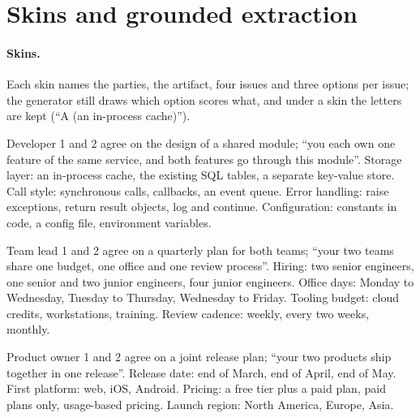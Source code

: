 \section{Skins and grounded extraction}
\label{app:skins}
\paragraph{Skins.} Each skin names the parties, the artifact, four issues and three options per issue; the generator still draws which option scores what, and under a skin the letters are kept (``A (an in-process cache)'').
\begin{description}\small
  \item[software design] Developer 1 and 2 agree on the design of a shared module; ``you each own one feature of the same service, and both features go through this module''. Storage layer: an in-process cache, the existing SQL tables, a separate key-value store. Call style: synchronous calls, callbacks, an event queue. Error handling: raise exceptions, return result objects, log and continue. Configuration: constants in code, a config file, environment variables.
  \item[team plan] Team lead 1 and 2 agree on a quarterly plan for both teams; ``your two teams share one budget, one office and one review process''. Hiring: two senior engineers, one senior and two junior engineers, four junior engineers. Office days: Monday to Wednesday, Tuesday to Thursday, Wednesday to Friday. Tooling budget: cloud credits, workstations, training. Review cadence: weekly, every two weeks, monthly.
  \item[release plan] Product owner 1 and 2 agree on a joint release plan; ``your two products ship together in one release''. Release date: end of March, end of April, end of May. First platform: web, iOS, Android. Pricing: a free tier plus a paid plan, paid plans only, usage-based pricing. Launch region: North America, Europe, Asia.
\end{description}

